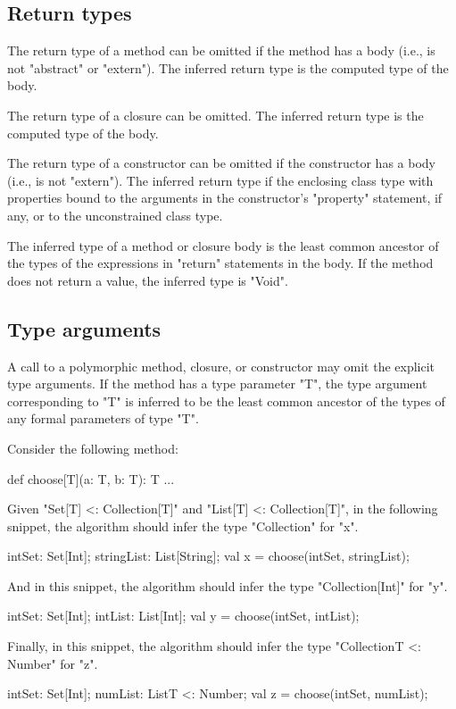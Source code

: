 \subsection{Return types}

The return type of a method can be omitted if the method has a
body (i.e., is not \xcd"abstract" or \xcd"extern").  The
inferred return type is the computed type of the body.

The return type of a closure can be omitted.
The inferred return type is the computed type of the body.

The return type of a constructor can be omitted if the
constructor has a body (i.e., is not \xcd"extern").
The inferred return type if the enclosing class type with
properties bound to the arguments in the constructor's \xcd"property"
statement, if any, or to the unconstrained class type.

The inferred type of a method or closure body is the least common ancestor
of the types of the expressions in \xcd"return" statements
in the body.  If the method does not return a value, the
inferred type is \xcd"Void".

\subsection{Type arguments}

A call to a polymorphic method, closure, or constructor may omit the
explicit type arguments.  If the method has a type parameter
\xcd"T", the type argument corresponding to \xcd"T" is inferred
to be the least common ancestor of the types of any formal
parameters of type \xcd"T".

Consider the following method:
\begin{xten}
def choose[T](a: T, b: T): T { ... }
\end{xten}
%
Given \xcd"Set[T] <: Collection[T]"
and \xcd"List[T] <: Collection[T]",
in the following snippet, the algorithm should infer the type
\xcd"Collection" for \xcd"x".
\begin{xten}
intSet: Set[Int];
stringList: List[String];
val x = choose(intSet, stringList);
\end{xten}
%
And in this snippet, the algorithm should infer the type
\xcd"Collection[Int]" for \xcd"y".
\begin{xten}
intSet: Set[Int];
intList: List[Int];
val y = choose(intSet, intList);
\end{xten}
%
Finally, in this snippet, the algorithm should infer the type
\xcd"Collection{T <: Number}" for \xcd"z".
\begin{xten}
intSet: Set[Int];
numList: List{T <: Number};
val z = choose(intSet, numList);
\end{xten}

